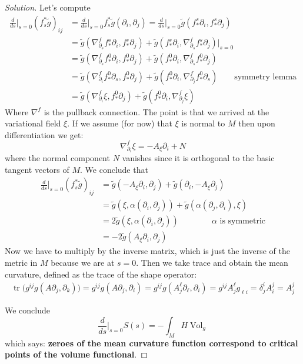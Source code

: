 \begin{proof}[Solution]
Let's compute
\begin{align*}
\frac{d}{ds}\Big|_{s=0}(f_s^*\tilde{g})_{ij}&=\frac{d}{ds}\Big|_{s=0}f_s^*\tilde{g}\left(\partial_i,\partial_j\right)=\frac{d}{ds}\Big|_{s=0}\tilde{g}(f^s_*\partial_i,f^s_*\partial_j)\\
&=\tilde{g}\left(\nabla^f_{\partial_s}f^s_*\partial_i,f^s_*\partial_j\right)+\tilde{g}\left(f^s_*\partial_i,\nabla^f_{\partial_s}f_*^s\partial_j\right)\Big|_{s=0}\\
&=\tilde{g}\left(\nabla^f_{\partial_s}f^0_*\partial_i,f_*^0\partial_j\right)+\tilde{g}\left(f^0_*\partial_i,\nabla^f_{\partial_s}f_*^0\partial_j\right)\\
&=\tilde{g}\left(\nabla^f_{\partial_i}f^0_*\partial_s,f_*^0\partial_j\right)+\tilde{g}\left(f^0_*\partial_i,\nabla^f_{\partial_j}f_*^0\partial_s\right)\qquad  \text{symmetry lemma} \\
&=\tilde{g}(\nabla^f_{\partial_i}\xi, f_*^0\partial_j)+\tilde{g}(f^0_*\partial_i,\nabla^f_{\partial_j}\xi)\end{align*}
Where \(\nabla^f\) is the pullback connection. The point is that we arrived at the variational field \(\xi\). If we assume (for now) that \(\xi\) is normal to \(M\) then upon differentiation we get:
\[\nabla^f_{\partial_i}\xi=-A_{\xi}\partial_i+N\]
where the normal component \(N\) vanishes since it is orthogonal to the basic tangent vectors of \(M\). We conclude that
\begin{align*}
\frac{d}{ds}\Big|_{s=0}(f_s^*\tilde{g})_{ij}&=\tilde{g}\left(-A_{\xi}\partial_i,\partial_j\right)+\tilde{g}\left(\partial_i,-A_{\xi}\partial_j\right)\\
&=\tilde{g}(\xi,\alpha(\partial_i,\partial_j))+\tilde{g}(\alpha(\partial_j,\partial_i),\xi)\\
&=2\tilde{g}(\xi,\alpha(\partial_i,\partial_j))\qquad\qquad \text{\(\alpha\) is symmetric}\\
&=-2\tilde{g}(A_{\xi}\partial_i,\partial_j)
\end{align*}
Now we have to multiply by the inverse matrix, which is just the inverse of the metric in \(M\) because we are at \(s=0\). Then we take trace and obtain the mean curvature, defined as the trace of the shape operator:
\begin{align*}
\operatorname{tr}\Big(g^{ij}g(A \partial_j,\partial_k)\Big)=g^{ij}g(A \partial_j,\partial_i)=g^{ij}g(A^\ell_j\partial_\ell,\partial_i)=g^{ij}A^\ell_jg_{\ell i}=\delta^{i}_jA^j_i=A^j_j
\end{align*}

We conclude
\[\frac{d}{ds}\Big|_{s=0}S(s)=-\int_M H \operatorname{Vol}_{g}\]
which says: \textbf{zeroes of the mean curvature function correspond to critical points of the volume functional}.
\end{proof}

